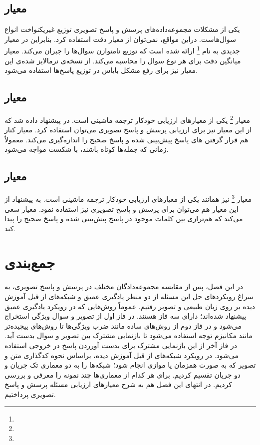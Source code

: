 \subsection{ معیار }

		یکی از مشکلات مجموعه‌داده‌های پرسش و پاسخ تصویری توزیع غیریکنواخت انواع سوال‌هاست. دراین مواقع، نمی‌توان از معیار دقت استفاده کرد. بنابراین  در 
	\cite{kafle2017analysis}
		 معیار جدیدی به نام 
	\footnote{}
		ارائه شده است که توزیع نامتوازن سوال‌ها را جبران می‌کند. معیار 
	میانگین دقت برای هر نوع سوال را محاسبه می‌کند. از نسخه‌ی نرمالایز شده‌ی این معیار نیز برای رفع مشکل بایاس در توزیع پاسخ‌ها استفاده می‌شود.


\subsection{معیار }
معیار
		\cite{papineni2002bleu}
		\footnote{}
		یکی از معیارهای ارزیابی خودکار ترجمه ماشینی است. در
		\cite{gurari2018vizwiz}
		 پیشنهاد داده شد که از این معیار نیز برای ارزیابی پرسش و پاسخ تصویری می‌توان استفاده کرد. معیار 
		کنار هم قرار گرفتن 
		های پاسخ پیش‌‌بینی شده و پاسخ صحیح را اندازه‌گیری می‌کند. معمولاً
	زمانی که جمله‌ها کوتاه باشند، با شکست مواجه می‌‌شود.
		


\subsection{معیار }
معیار
		\cite{denkowski2014meteor}
		\footnote{}
		نیز همانند
	یکی از معیارهای ارزیابی خودکار ترجمه ماشینی است. به پیشنهاد 
	\cite{gurari2018vizwiz}
	 از این معیار هم می‌توان برای پرسش و پاسخ تصویری نیز استفاده نمود. معیار 
		سعی می‌کند که هم‌ترازی بین کلمات موجود در پاسخ پیش‌بینی شده و پاسخ صحیح را پیدا کند.
\section{جمع‌بندی}
در این فصل، پس از مقایسه مجموعه‌دادگان مختلف در پرسش و پاسخ تصویری، به سراغ رویکرد‌های حل این مسئله از دو منظر یادگیری عمیق و شبکه‌های از قبل آموزش دیده بر روی زبان طبیعی و تصویر رفتیم. عموماً روش‌هایی که در رویکرد یادگیری عمیق پیشنهاد شده‌اند؛ دارای سه فاز هستند. در فاز اول از تصویر و سوال ویژگی استخراج می‌شود و در فاز دوم از روش‌های ساده مانند ضرب ویژگی‌ها تا روش‌های پیچیده‌تر مانند مکانیزم توجه استفاده می‌شود تا بازنمایی مشترک بین تصویر و سوال بدست آید. در فاز آخر از این بازنمایی مشترک برای بدست آورردن پاسخ در خروجی استفاده می‌شود. در رویکرد شبکه‌های از قبل آموزش دیده، براساس نحوه کدگذاری متن  و تصویر که به صورت همزمان یا موازی انجام ‌شود؛ شبکه‌‌ها را به دو معماری تک جریان و دو جریان تقسیم کردیم. برای هر کدام از معماری‌ها چند نمونه را معرفی و بررسی  کردیم. در انتهای این فصل هم به شرح معیار‌های ارزیابی مسئله پرسش و پاسخ تصویری پرداختیم.


